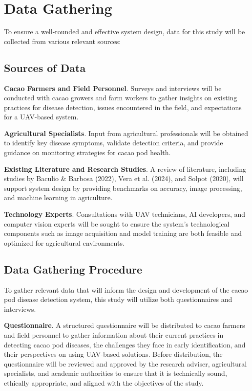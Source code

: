 \section{Data Gathering}
To ensure a well-rounded and effective system design, data for this study will be collected from various relevant sources:

\subsection*{Sources of Data}
\textbf{Cacao Farmers and Field Personnel}. Surveys and interviews will be conducted with cacao growers and farm workers to gather insights on existing practices for disease detection, issues encountered in the field, and expectations for a UAV-based system. 

\textbf{Agricultural Specialists}. Input from agricultural professionals will be obtained to identify key disease symptoms, validate detection criteria, and provide guidance on monitoring strategies for cacao pod health.

\textbf{Existing Literature and Research Studies}. A review of literature, including studies by Baculio \& Barbosa (2022), Vera et al. (2024), and Solpot (2020), will support system design by providing benchmarks on accuracy, image processing, and machine learning in agriculture.




\textbf{Technology Experts}. Consultations with UAV technicians, AI developers, and computer vision experts will be sought to ensure the system’s technological components such as image acquisition and model training are both feasible and optimized for agricultural environments.

\subsection*{Data Gathering Procedure}

To gather relevant data that will inform the design and development of the cacao pod disease detection system, this study will utilize both questionnaires and interviews.

\textbf{Questionnaire}. A structured questionnaire will be distributed to cacao farmers and field personnel to gather information about their current practices in detecting cacao pod diseases, the challenges they face in early identification, and their perspectives on using UAV-based solutions. Before distribution, the questionnaire will be reviewed and approved by the research adviser, agricultural specialists, and academic authorities to ensure that it is technically sound, ethically appropriate, and aligned with the objectives of the study.

